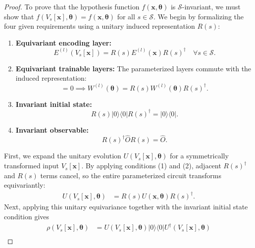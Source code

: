\documentclass[%
 reprint,
 amsmath,amssymb,
 aps,
 pra,
]{revtex4-2}
\theoremstyle{definition}
\begin{document}
\begin{proof}
To prove that the hypothesis function \(f(\bm{x}, \bm{\theta})\) is \(\mathcal{S}\)-invariant, we must show that \(f(V_s[\bm{x}], \bm{\theta}) = f(\bm{x}, \bm{\theta})\) for all \(s \in \mathcal{S}\). We begin by formalizing the four given requirements using a unitary induced representation \(R(s)\):
\begin{enumerate}
    \item \textbf{Equivariant encoding layer:}
    \begin{equation}
    E^{(l)}(V_s[\bm{x}]) = R(s) E^{(l)}(\bm{x}) R(s)^\dagger \quad \forall s \in \mathcal{S}.
    \end{equation}
    \item \textbf{Equivariant trainable layers:} The parameterized layers commute with the induced representation:
    \begin{equation}
    [W^{(l)}(\bm{\theta}), R(s)] = 0 \implies W^{(l)}(\bm{\theta}) = R(s) W^{(l)}(\bm{\theta}) R(s)^\dagger.
    \end{equation}
    \item \textbf{Invariant initial state:}
    \begin{equation}
    R(s)|0\rangle\langle0|R(s)^\dagger = |0\rangle\langle0|.
    \end{equation}
    \item \textbf{Invariant observable:}
    \begin{equation}
    R(s)^\dagger \hat{O} R(s) = \hat{O}.
    \end{equation}
\end{enumerate}
First, we expand the unitary evolution \(U(V_s[\bm{x}], \bm{\theta})\) for a symmetrically transformed input \(V_s[\bm{x}]\). By applying conditions (1) and (2), adjacent \(R(s)^\dagger\) and \(R(s)\) terms cancel, so the entire parameterized circuit transforms equivariantly:
\begin{equation}
\begin{aligned}
U(V_s[\bm{x}], \bm{\theta})
&= R(s) U(\bm{x}, \bm{\theta}) R(s)^\dagger.
\end{aligned}
\end{equation}
Next, applying this unitary equivariance together with the invariant initial state condition gives
\begin{equation}
\begin{aligned}
\rho(V_s[\bm{x}], \bm{\theta})
&= U(V_s[\bm{x}], \bm{\theta}) |0\rangle\langle0| U^\dagger(V_s[\bm{x}], \bm{\theta}) \\

\end{aligned}
\end{equation}
\end{proof}
\end{document}
